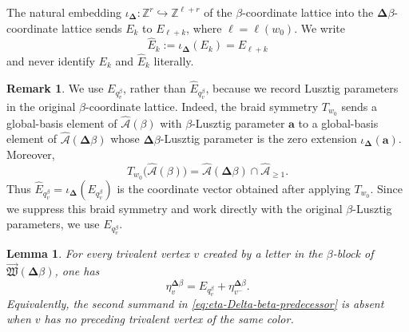 \documentclass[12pt, reqno]{amsart}
\theoremstyle{plain}
\newtheorem{lemma}[theorem]{Lemma}
\theoremstyle{definition}
\newtheorem{remark}[theorem]{Remark}
\numberwithin{equation}{section}
\newcommand{\ZZ}{\mathbb{Z}}
\newcommand{\cA}{\mathcal{A}}
\begin{document}
The natural embedding
\(\iota_{\boldsymbol\Delta}\colon\ZZ^r\hookrightarrow
\ZZ^{\ell+r}\) of the \(\beta\)-coordinate lattice into the
\(\boldsymbol{\Delta}\beta\)-coordinate lattice sends
\(E_k\) to \(E_{\ell+k}\), where \(\ell=\ell(w_0)\). We write
\begin{equation}\label{eq:embedded-beta-coordinate-after-Delta}
    \widehat E_k
    :=\iota_{\boldsymbol\Delta}(E_k)=E_{\ell+k}
\end{equation}
and never identify \(E_k\) and \(\widehat E_k\) literally.

\begin{remark}
We use \(E_{q_v^\beta}\), rather than
\(\widehat E_{q_v^\beta}\), because we record Lusztig parameters in
the original \(\beta\)-coordinate lattice. Indeed, the braid symmetry
\(T_{w_0}\) sends a global-basis element of
\(\widehat{\cA}(\beta)\) with \(\beta\)-Lusztig parameter
\(\mathbf a\) to a global-basis element of
\(\widehat{\cA}(\boldsymbol{\Delta}\beta)\) whose
\(\boldsymbol{\Delta}\beta\)-Lusztig parameter is the zero extension
\(\iota_{\boldsymbol{\Delta}}(\mathbf a)\). Moreover,
\[
    T_{w_0}\bigl(\widehat{\cA}(\beta)\bigr)
    =
    \widehat{\cA}(\boldsymbol{\Delta}\beta)
    \cap \widehat{\cA}_{\geq1}.
\]
Thus \(\widehat E_{q_v^\beta}
=\iota_{\boldsymbol{\Delta}}(E_{q_v^\beta})\) is the coordinate
vector obtained after applying \(T_{w_0}\). Since we suppress this
braid symmetry and work directly with the original
\(\beta\)-Lusztig parameters, we use \(E_{q_v^\beta}\).
\end{remark}


\begin{lemma}\label{lem:eta-Delta-beta-predecessor}
For every trivalent vertex \(v\) created by a letter in the \(\beta\)-block
of \(\overrightarrow{\mathfrak W}(\boldsymbol{\Delta}\beta)\), one has
\begin{equation}\label{eq:eta-Delta-beta-predecessor}
    \eta_v^{\boldsymbol{\Delta}\beta}
    =E_{q_v^\beta}
     +\eta_{v^-}^{\boldsymbol{\Delta}\beta}.
\end{equation}
Equivalently, the second summand in
\eqref{eq:eta-Delta-beta-predecessor} is absent when \(v\) has no
preceding trivalent vertex of the same color.
\end{lemma}
\end{document}
